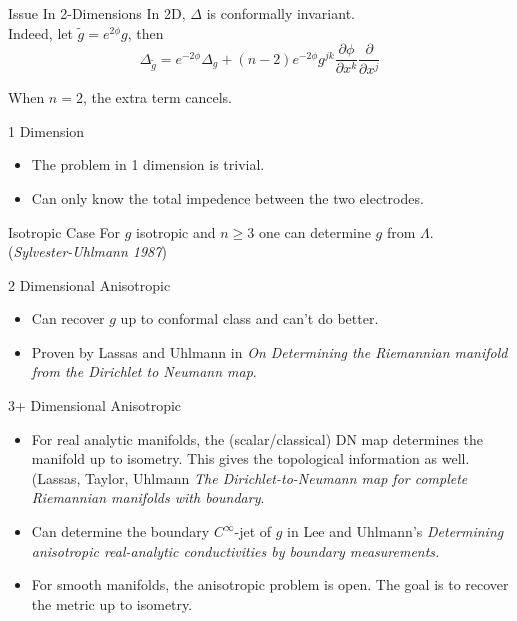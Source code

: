 \documentclass[aspectratio=169]{beamer}
\begin{document}
\begin{frame}{Issue In 2-Dimensions}
    \pause In 2D, $\Delta$ is conformally invariant.  \\
    
    \vspace*{.5cm}
    \pause Indeed, let $\tilde{g}=e^{2\phi}g$, then
    \[
    \Delta_{\tilde{g}} = e^{-2\phi}\Delta_g +(n-2)e^{-2\phi} g^{jk} \frac{\partial \phi}{\partial x^k} \frac{\partial}{\partial x^j}
    \]
    
    \pause When $n=2$, the extra term cancels.
\end{frame}

\begin{frame}{1 Dimension}
\vfill
\pause
    \begin{itemize}
        \item The problem in 1 dimension is trivial.
        
        \pause
        \item Can only know the total impedence between the two electrodes.
        
    \end{itemize}
\vfill
\end{frame}

\begin{frame}{Isotropic Case}
    For $g$ isotropic and $n\geq 3$ one can determine $g$ from $\Lambda$. \\
    (\emph{Sylvester-Uhlmann 1987})
    
\end{frame}

\begin{frame}{2 Dimensional Anisotropic}
\vfill
    \begin{itemize}
        \item Can recover $g$ up to conformal class and can't do better.
        \item Proven by Lassas and Uhlmann in \emph{On Determining the Riemannian manifold from the Dirichlet to Neumann map}.
    \end{itemize}
\vfill
\end{frame}

\begin{frame}{3+ Dimensional Anisotropic}
\vfill
\pause
    \begin{itemize}
        \item For real analytic manifolds, the (scalar/classical) DN map determines the manifold up to isometry.  This gives the topological information as well. (Lassas, Taylor, Uhlmann \emph{The Dirichlet-to-Neumann map for complete Riemannian manifolds with boundary}.
        
        \pause
        \item Can determine the boundary $C^\infty$-jet of $g$ in Lee and Uhlmann's \emph{Determining anisotropic real-analytic conductivities by boundary measurements.}
        
        \pause
        \item For smooth manifolds, the anisotropic problem is open. The goal is to recover the metric up to isometry.
    \end{itemize}
\end{frame}
\end{document}
